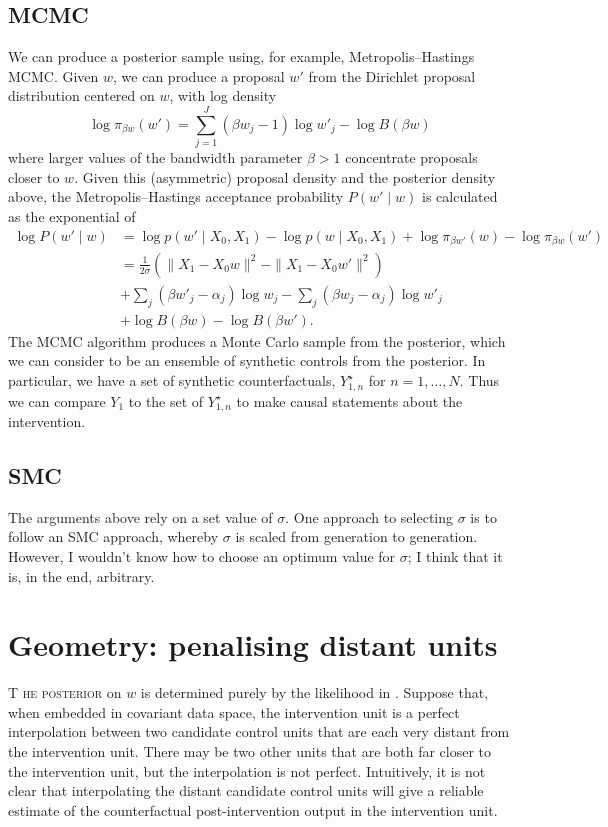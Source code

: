 \documentclass[a4paper, 12pt, onecolumn, singlepage]{article}
\newcommand{\TestLettrine}[2]{\needspace{3\baselineskip} \lettrine[lines=3]{#1}{ #2}}
\begin{document}
\subsection{MCMC}
We can produce a posterior sample using, for example, Metropolis--Hastings MCMC.
Given $w$, we can produce a proposal $w'$ from the Dirichlet proposal distribution centered on $w$,
with log density
\[
\log \pi_{\beta w}(w') = \sum_{j=1}^J (\beta w_j - 1) \log w'_j - \log B(\beta w)
\]
where larger values of the bandwidth parameter $\beta > 1$ concentrate proposals closer to $w$.
Given this (asymmetric) proposal density and the posterior density above,
the Metropolis--Hastings acceptance probability $P(w' \mid w)$ is calculated as the exponential of
\begin{align*}
\log P(w' \mid w) &= \log p(w' \mid X_0, X_1) - \log p(w \mid X_0, X_1) + \log \pi_{\beta w'}(w) - \log \pi_{\beta w}(w') \\
&= \frac{1}{2\sigma} \left( \|X_1 - X_0 w \|^2 - \| X_1 - X_0 w' \|^2 \right) \\
&+ \sum_j (\beta w'_j - \alpha_j) \log w_j - \sum_j (\beta w_j - \alpha_j) \log w'_j \\
&+ \log B(\beta w) - \log B(\beta w').
\end{align*}
The MCMC algorithm produces a Monte Carlo sample from the posterior,
which we can consider to be an ensemble of synthetic controls from the posterior.
In particular, we have a set of synthetic counterfactuals, $Y_{1,n}^\star$ for $n=1,\dots,N$.
Thus we can compare $Y_1$ to the set of $Y_{1,n}^\star$ to make causal statements about the intervention.


\subsection{SMC}
The arguments above rely on a set value of $\sigma$.
One approach to selecting $\sigma$ is to follow an SMC approach,
whereby $\sigma$ is scaled from generation to generation.
However, I wouldn't know how to choose an optimum value for $\sigma$;
I think that it is, in the end, arbitrary.

\section{Geometry: penalising distant units}
\TestLettrine{T}{he posterior}
on $w$ is determined purely by the likelihood in .
Suppose that, when embedded in covariant data space,
the intervention unit is a perfect interpolation between two candidate control units
that are each very distant from the intervention unit.
There may be two other units that are both far closer to the intervention unit,
but the interpolation is not perfect.
Intuitively, it is not clear that interpolating the distant candidate control units
will give a reliable estimate of the counterfactual post-intervention output in the intervention unit.
\end{document}
